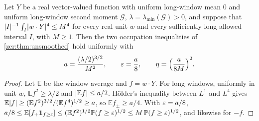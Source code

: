 \begin{lemma}\label{zer:lem:occupation4}
Let $Y$ be a real vector-valued function with uniform long-window mean $0$ and uniform long-window
second moment $\mathcal G$, $\lambda=\lambda_{\min}(\mathcal G)>0$, and suppose that
$\lvert I\rvert^{-1}\int_I\lvert w\cdot Y\rvert^4\le M^4$ for every real unit $w$ and every sufficiently long allowed
interval $I$, with $M\ge1$. Then the two occupation inequalities of \cref{zer:thm:unsmoothed} hold
uniformly with
\[
 a=\frac{(\lambda/2)^{3/2}}{M^2},\qquad\varepsilon=\frac a8,\qquad\eta=\Bigl(\frac a{8M}\Bigr)^2 .
\]
\end{lemma}
\begin{proof}
Let $\mathbb E$ be the window average and $f=w\cdot Y$. For long windows, uniformly in unit $w$,
$\mathbb Ef^2\ge\lambda/2$ and $\lvert\mathbb Ef\rvert\le a/2$. H\"older's inequality between $L^1$ and $L^4$
gives $\mathbb E\lvert f\rvert\ge(\mathbb Ef^2)^{3/2}/(\mathbb Ef^4)^{1/2}\ge a$, so $\mathbb Ef_\pm\ge a/4$. With
$\varepsilon=a/8$, $a/8\le\mathbb E[f_+\mathbf 1_{f\ge\varepsilon}]\le(\mathbb Ef^2)^{1/2}\mathbb P(f\ge\varepsilon)^{1/2}
\le M\,\mathbb P(f\ge\varepsilon)^{1/2}$, and likewise for $-f$.
\end{proof}

